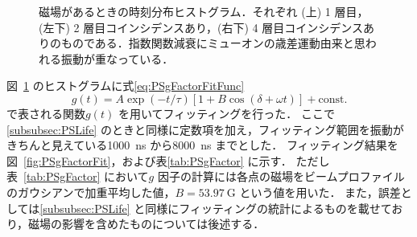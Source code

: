 \begin{figure}[h]
\begin{minipage}{0.45\textwidth}
	\end{minipage}
	\caption{磁場があるときの時刻分布ヒストグラム．それぞれ (上) 1 層目，(左下) 2 層目コインシデンスあり，(右下) 4 層目コインシデンスありのものである．指数関数減衰にミューオンの歳差運動由来と思われる振動が重なっている．}
	\label{fig:PSgFactorDist}
\end{figure}%

図~\ref{fig:PSgFactorDist} のヒストグラムに式\eqref{eq:PSgFactorFitFunc}
\begin{equation}
g(t) = A \exp(-t / \tau) [1 + B \cos(\delta + \omega t)] + \mathrm{const.}
\label{eq:PSgFactorFitFunc}
\end{equation}
で表される関数$g(t)$ を用いてフィッティングを行った．
ここで\ref{subsubsec:PSLife} のときと同様に定数項を加え，フィッティング範囲を振動がきちんと見えている1000~ns から8000~ns までとした．
フィッティング結果を図~\ref{fig:PSgFactorFit}，および表\ref{tab:PSgFactor} に示す．
ただし表~\ref{tab:PSgFactor} において$g$ 因子の計算には各点の磁場をビームプロファイルのガウシアンで加重平均した値，$B = 53.97~\mathrm{G}$ という値を用いた．
また，誤差としては\ref{subsubsec:PSLife} と同様にフィッティングの統計によるものを載せており，磁場の影響を含めたものについては後述する．
